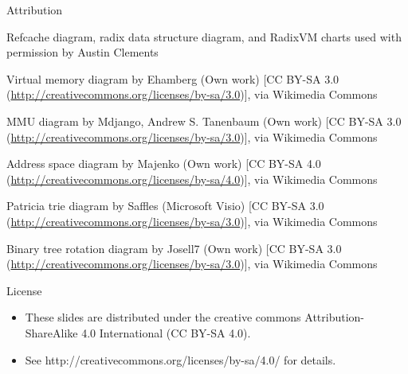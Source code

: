 \documentclass[aspectratio=169]{beamer}
\newcommand{\bi}{\begin{itemize}}
\newcommand{\ei}{\end{itemize}}
\begin{document}
\begin{frame}[noframenumbering]{Attribution}
  \bi
  {\small
\item Refcache diagram, radix data structure diagram, and RadixVM charts used with permission by Austin Clements
\item Virtual memory diagram by Ehamberg (Own work) [CC BY-SA 3.0 (\url{http://creativecommons.org/licenses/by-sa/3.0})], via Wikimedia Commons
  \item MMU diagram by Mdjango, Andrew S. Tanenbaum (Own work) [CC BY-SA 3.0 (\url{http://creativecommons.org/licenses/by-sa/3.0})], via Wikimedia Commons
\item Address space diagram by Majenko (Own work) [CC BY-SA 4.0 (\url{http://creativecommons.org/licenses/by-sa/4.0})], via Wikimedia Commons
\item Patricia trie diagram by Saffles (Microsoft Visio) [CC BY-SA 3.0 (\url{http://creativecommons.org/licenses/by-sa/3.0})], via Wikimedia Commons
  \item Binary tree rotation diagram by Josell7 (Own work) [CC BY-SA 3.0 (\url{http://creativecommons.org/licenses/by-sa/3.0})], via Wikimedia Commons}
  \ei
\end{frame}

\begin{frame}[noframenumbering]{License}
  \bi
\item These slides are distributed under the creative commons
  Attribution-ShareAlike 4.0 International (CC BY-SA 4.0).
\item See http://creativecommons.org/licenses/by-sa/4.0/ for details.
  \ei
\end{frame}
\end{document}
